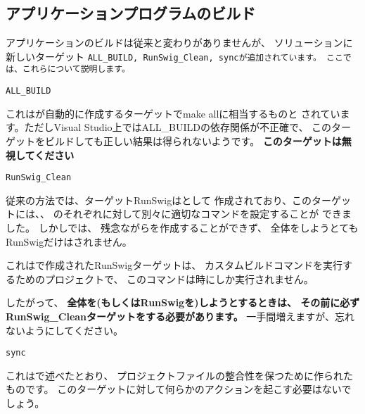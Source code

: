 \subsection{アプリケーションプログラムのビルド}
\label{subsec:BuildApplication}

\noindent
アプリケーションのビルドは従来と変わりがありませんが、
ソリューションに新しいターゲット
\tt{ALL\_BUILD}, \tt{RunSwig\_Clean}, \tt{sync}が追加されています。
ここでは、これらについて説明します。

\medskip
\noindent
\tt{ALL\_BUILD}
\begin{narrow}[20pt]
	これは\cmake が自動的に作成するターゲットでmake allに相当するものと
	されています。ただしVisual Studio上ではALL\_BUILDの依存関係が不正確で、
	このターゲットをビルドしても正しい結果は得られないようです。
	{\bf{このターゲットは無視してください}}
\end{narrow}

\noindent
\tt{RunSwig\_Clean}
\begin{narrow}[20pt]
	従来の方法では、ターゲットRunSwigはとして
	作成されており、このターゲットには、、
	のそれぞれに対して別々に適切なコマンドを設定することが
	できました。
	しかし\cmake では、
	残念ながらを作成することができず、
	全体をしようとてもRunSwigだけはされません。
	\begin{narrow}[s][15pt]
		これは\cmake で作成されたRunSwigターゲットは、
		カスタムビルドコマンドを実行するためのプロジェクトで、
		このコマンドは時にしか実行されません。
	\end{narrow}
	したがって、
	{\bf{全体を(もしくはRunSwigを)しようとするときは、
	その前に必ずRunSwig\_Cleanターゲットをする必要があります。}}
	一手間増えますが、忘れないようにしてください。
\end{narrow}

\noindent
\tt{sync}
\begin{narrow}[20pt]
	これはで述べたとおり、
	プロジェクトファイルの整合性を保つために作られたものです。
	このターゲットに対して何らかのアクションを起こす必要はないでしょう。
\end{narrow}


